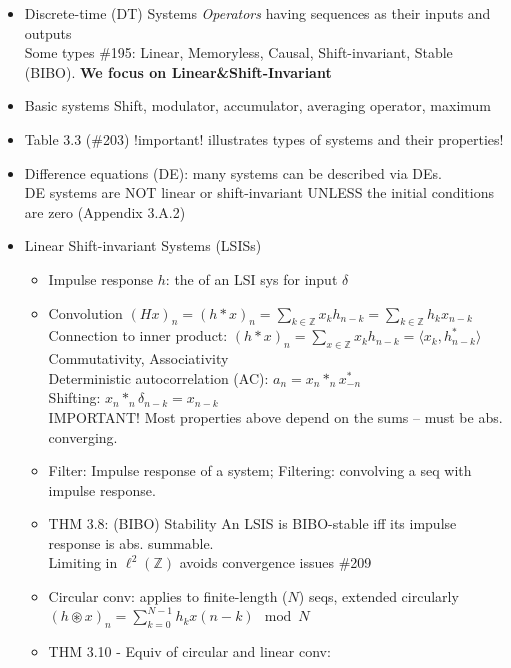 \documentclass{article}
\newcommand{\la}{\langle}
\newcommand{\ra}{\rangle}
\newcommand{\cg}{\color{gray}}
\newcommand{\fs}{\footnotesize}
\begin{document}
\begin{itemize}
\item Discrete-time (DT) Systems {\cg \textit{Operators} having sequences as their inputs and outputs}\\
{\cg\fs Some types \#195: \color{gray} Linear, Memoryless, Causal, Shift-invariant, Stable (BIBO). {\bf We focus on Linear\&Shift-Invariant}}
\item Basic systems {\color{gray} Shift, modulator, accumulator, averaging operator, maximum}
\item Table 3.3 (\#203) !important! illustrates types of systems and their properties!
\item Difference equations (DE): many systems can be described via DEs. \\
{\color{gray} \footnotesize
DE systems are NOT linear or shift-invariant UNLESS the initial conditions are zero (Appendix 3.A.2)
}
\item Linear Shift-invariant Systems (LSISs)
\begin{itemize}
	\item Impulse response {\color{gray} $h$: the of an LSI sys for input $\delta$}
	\item Convolution {\color{gray} $(Hx)_n=(h\ast x)_n=\sum_{k\in\mathbb{Z}}x_kh_{n-k}=\sum_{k\in\mathbb{Z}}h_kx_{n-k}$} \\
	{\color{gray}\footnotesize
	Connection to inner product: $(h\ast x)_n=\sum_{x\in\mathbb{Z}}x_kh_{n-k}=\la x_k, h_{n-k}^{*} \ra$\\
	Commutativity, Associativity\\
	Deterministic autocorrelation (AC): $a_n = x_n\ast_n x^{*}_{-n}$ \\
	Shifting: $x_n\ast_n\delta_{n-k}=x_{n-k}$	\\
	IMPORTANT! Most properties above depend on the sums -- must be abs. converging.
	}
	\item Filter: {\color{gray}Impulse response of a system}; Filtering: {\color{gray} convolving a seq with impulse response}.
	\item THM 3.8: (BIBO) Stability {\color{gray}An LSIS is BIBO-stable iff its impulse response is abs. summable. \\
	Limiting in $\ell^2(\mathbb{Z})$ avoids convergence issues \#209}
	\item Circular conv: {\color{gray} applies to finite-length ($N$) seqs, extended circularly	}
 \\
	{\color{gray} \footnotesize
	$(h\circledast x)_n=\sum_{k=0}^{N-1}h_kx{(n-k)\mod N}$}
	\item THM 3.10 - Equiv of circular and linear conv: \\

\end{itemize}
\end{itemize}
\end{document}
